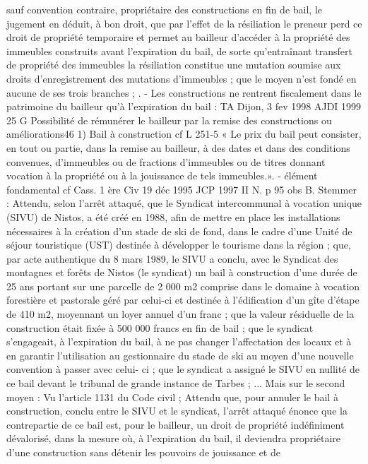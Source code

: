 \documentclass[11pt,a4paper]{report}
\begin{document}
	sauf convention contraire, propriétaire des constructions en fin de bail, le jugement en déduit, à bon droit, que
	par l'effet de la résiliation le preneur perd ce droit de propriété temporaire et permet au bailleur d'accéder à la
	propriété des immeubles construits avant l'expiration du bail, de sorte qu'entraînant transfert de propriété des
	immeubles la résiliation constitue une mutation soumise aux droits d'enregistrement des mutations d'immeubles ;
	que le moyen n'est fondé en aucune de ses trois branches ;
	.
	- Les constructions ne rentrent fiscalement dans le patrimoine du bailleur qu’à l’expiration du bail : TA
	Dijon, 3 fev 1998 AJDI 1999 25
	G Possibilité de rémunérer le bailleur par la remise des constructions ou améliorations46
	1) Bail à construction cf L 251-5 « Le prix du bail peut consister, en tout ou partie, dans la remise au bailleur,
	à des dates et dans des conditions convenues, d'immeubles ou de fractions d'immeubles ou de titres donnant
	vocation à la propriété ou à la jouissance de tels immeubles.».
	- élément fondamental cf Cass. 1 ère Civ 19 déc 1995 JCP 1997 II N. p 95 obs B. Stemmer :
	Attendu, selon l'arrêt attaqué, que le Syndicat intercommunal à vocation unique (SIVU) de Nistos, a été créé en
	1988, afin de mettre en place les installations nécessaires à la création d'un stade de ski de fond, dans le cadre
	d'une Unité de séjour touristique (UST) destinée à développer le tourisme dans la région ; que, par acte
	authentique du 8 mars 1989, le SIVU a conclu, avec le Syndicat des montagnes et forêts de Nistos (le syndicat)
	un bail à construction d'une durée de 25 ans portant sur une parcelle de 2 000 m2 comprise dans le domaine à
	vocation forestière et pastorale géré par celui-ci et destinée à l'édification d'un gîte d'étape de 410 m2,
	moyennant un loyer annuel d'un franc ; que la valeur résiduelle de la construction était fixée à 500 000 francs
	en fin de bail ; que le syndicat s'engageait, à l'expiration du bail, à ne pas changer l'affectation des locaux et à
	en garantir l'utilisation au gestionnaire du stade de ski au moyen d'une nouvelle convention à passer avec celui-
	ci ; que le syndicat a assigné le SIVU en nullité de ce bail devant le tribunal de grande instance de Tarbes ;
	...
	Mais sur le second moyen :
	Vu l'article 1131 du Code civil ;
	Attendu que, pour annuler le bail à construction, conclu entre le SIVU et le syndicat, l'arrêt attaqué énonce que
	la contrepartie de ce bail est, pour le bailleur, un droit de propriété indéfiniment dévalorisé, dans la mesure où,
	à l'expiration du bail, il deviendra propriétaire d'une construction sans détenir les pouvoirs de jouissance et de
\end{document}
